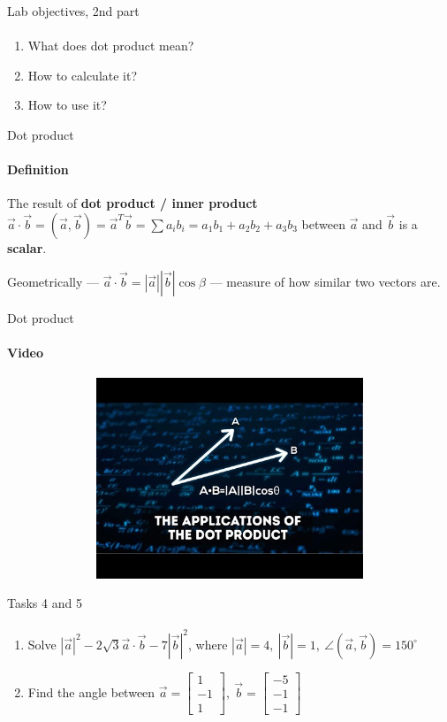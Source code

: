 \documentclass[aspectratio=169,notes]{beamer}
\begin{document}
\begin{frame}[t]{Lab objectives, 2nd part}
\framesubtitle{}
    \begin{enumerate}
        \item What does dot product mean?
        \item How to calculate it?
        \item How to use it?
    \end{enumerate}
\end{frame}

\begin{frame}[t]{Dot product}
\framesubtitle{Definition}
The result of \textbf{dot product / inner product} $\vec{a} \cdot \vec{b}= (\vec{a},\vec{b}) = \vec{a}^T\vec{b} = \sum a_i b_i = a_1 b_1 + a_2 b_2 + a_3 b_3 $  between $\vec{a}$ and $\vec{b}$ is a \textbf{scalar}. 
\medskip

Geometrically --- $\vec{a} \cdot \vec{b} = |\vec{a}| |\vec{b}| \cos \beta$ --- measure of how similar two vectors are.
\end{frame}

\begin{frame}[t]{Dot product}
    \framesubtitle{Video}
    \vspace{-0.6cm}
    \begin{figure}[H]
        \href{http://www.youtube.com/watch?v=TBpDMLCC2uY&t=65}{
            \centering\includegraphics[height=6cm,width=1\textwidth,keepaspectratio]{resources/image24.jpg}}
        \label{fig:resources/image24.jpg}
    \end{figure}
\end{frame}

\begin{frame}[t]{Tasks 4 and 5}
\framesubtitle{}
\begin{enumerate}
    \item Solve $|\vec{a}|^2 - 2\sqrt{3}\vec{a} \cdot \vec{b} - 7 |\vec{b}|^2$, where $ |\vec{a}| = 4,\ |\vec{b}| = 1,\ \angle(\vec{a},\vec{b}) = 150^\circ$
    \item Find the angle between $\vec{a}=\begin{bmatrix} 1\\ -1\\ 1 \end{bmatrix},\ \vec{b}=\begin{bmatrix} -5\\ -1\\ -1 \end{bmatrix}$
\end{enumerate}
\end{frame}
\end{document}
